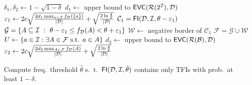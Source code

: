 \begin{algorithm}[htbp]
   \DontPrintSemicolon
  $\delta_1,\delta_2\leftarrow 1-\sqrt{1-\delta}$ 
  $d_1\leftarrow$ upper bound to $\mathsf{EVC}(\mathcal{R}(2^{\cal I}),{\cal D})$  
  $\varepsilon_1\leftarrow 2c\sqrt{\frac{2d_1\max_{a\in{\cal I}}f_{\cal D}(\{a\})}{|{\cal D}|}}
  + \sqrt{\frac{2\ln\frac{4}{\delta}}{|{\cal D}|}}$\;
  $\mathcal{C}_1=\mathsf{FI}({\cal D},{\cal I},\theta-\varepsilon_1)$\;
  $\mathcal{G}=\{A\subseteq{\cal I} ~:~ \theta-\varepsilon_1\le
f_{\cal D}(A)<\theta+\varepsilon_1\}$\;
  $\mathcal{W}\leftarrow$ negative border of $\mathcal{C}_1$\;
  $\mathcal{F}=\mathcal{G}\cup\mathcal{W}$\;
  $U\leftarrow\{a\in{\cal I} : \exists A\in\mathcal{F} \mbox{ s.t. } a\in A\}$\;
  $d_2\leftarrow$ upper bound to $\mathsf{EVC}(\mathcal{R}(\mathcal{B}),{\cal D})$ 
  $\varepsilon_2\leftarrow 2c\sqrt{\frac{2d_2\max_{A\in\mathcal{F}}f_{\cal D}(A)}{|{\cal D}|}}
  + \sqrt{\frac{2\ln\frac{4}{\delta}}{|{\cal D}|}}$\;
  \caption{Compute freq.~threshold $\hat{\theta}$
  s.~t.~$\mathsf{FI}({\cal D},{\cal I},\hat{\theta})$ contains only TFIs with prob.~at least
  $1-\delta$.}
  \label{alg:vcfull}
\end{algorithm}

